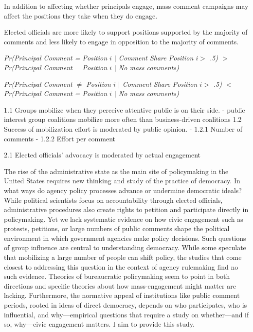 In addition to affecting whether principals engage, mass comment campaigns may affect the positions they take when they do engage. 

\begin{hyp} \label{hyp:principals}
 Elected officials are more likely to support positions supported by the majority of comments and less likely to engage in opposition to the majority of comments.
\end{hyp}

\textit{Pr(Principal Comment = Position $i$ $|$ Comment Share Position $i >$ .5) $>$ Pr(Principal Comment = Position $i$ $|$ No mass comments)}

\textit{Pr(Principal Comment $\neq$ Position $i$ $|$ Comment Share Position $i >$ .5) $<$ Pr(Principal Comment = Position $i$  $|$ No mass comments)}

1.1 Groups mobilize when they perceive attentive public is on their side.
- public interest group coalitions mobilize more often than business-driven coalitions
1.2 Success of mobilization effort is moderated by public opinion. 
- 1.2.1 Number of comments 
- 1.2.2 Effort per comment 

2.1 Elected officials' advocacy is moderated by actual engagement





The rise of the administrative state as the main site of policymaking in the United States requires new thinking and study of the practice of democracy. In what ways do agency policy processes advance or undermine democratic ideals? While political scientists focus on accountability through elected officials, administrative procedures also create rights to petition and participate directly in policymaking.  Yet we lack systematic evidence on how civic engagement such as protests, petitions, or large numbers of public comments shape the political environment in which government agencies make policy decisions. Such questions of group influence are central to understanding democracy. While some speculate that mobilizing a large number of people can shift policy, the studies that come closest to addressing this question in the context of agency rulemaking find no such evidence. Theories of bureaucratic policymaking seem to point in both directions and specific theories about how mass-engagement might matter are lacking. Furthermore, the normative appeal of institutions like public comment periods, rooted in ideas of direct democracy, depends on who participates, who is influential, and why---empirical questions that require a study on whether---and if so, why---civic engagement matters. I aim to provide this study.

